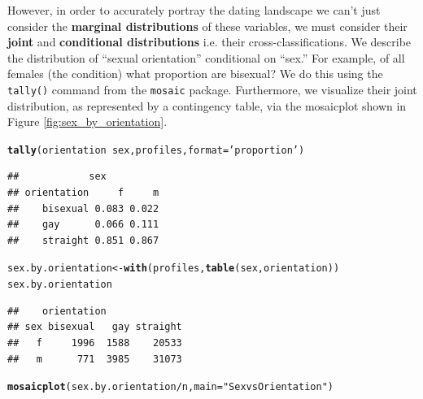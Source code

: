 \documentclass{article}\usepackage[]{graphicx}\usepackage[]{color}
\makeatletter
\newcommand{\hlstr}[1]{\textcolor[rgb]{0.192,0.494,0.8}{#1}}%
\newcommand{\hlopt}[1]{\textcolor[rgb]{0,0,0}{#1}}%
\newcommand{\hlstd}[1]{\textcolor[rgb]{0.345,0.345,0.345}{#1}}%
\newcommand{\hlkwb}[1]{\textcolor[rgb]{0.69,0.353,0.396}{#1}}%
\newcommand{\hlkwc}[1]{\textcolor[rgb]{0.333,0.667,0.333}{#1}}%
\newcommand{\hlkwd}[1]{\textcolor[rgb]{0.737,0.353,0.396}{\textbf{#1}}}%
\newenvironment{kframe}{%
 \def\at@end@of@kframe{}%
 \ifinner\ifhmode%
  \def\at@end@of@kframe{\end{minipage}}%
  \begin{minipage}{\columnwidth}%
 \fi\fi%
 \def\FrameCommand##1{\hskip\@totalleftmargin \hskip-\fboxsep
 \colorbox{shadecolor}{##1}\hskip-\fboxsep
     \hskip-\linewidth \hskip-\@totalleftmargin \hskip\columnwidth}%
 \MakeFramed {\advance\hsize-\width
   \@totalleftmargin\z@ \linewidth\hsize
   \@setminipage}}%
 {\par\unskip\endMakeFramed%
 \at@end@of@kframe}
\newenvironment{knitrout}{}{} %
\makeatother
\begin{document}
However, in order to accurately portray the dating landscape we can't just consider the \textbf{marginal distributions} of these variables, we must consider their \textbf{joint} and \textbf{conditional distributions} i.e. their cross-classifications.  We describe the distribution of ``sexual orientation'' conditional on ``sex.''  For example, of all females (the condition) what proportion are bisexual?  We do this using the \verb#tally()# command from the \verb#mosaic# package.  Furthermore, we visualize their joint distribution, as represented by a contingency table, via the mosaicplot shown in Figure \ref{fig:sex_by_orientation}.

\begin{knitrout}
\color{fgcolor}\begin{kframe}
\begin{alltt}
\hlkwd{tally}\hlstd{(orientation} \hlopt{~} \hlstd{sex, profiles,} \hlkwc{format}\hlstd{=}\hlstr{'proportion'}\hlstd{)}
\end{alltt}
\begin{verbatim}
##            sex
## orientation     f     m
##    bisexual 0.083 0.022
##    gay      0.066 0.111
##    straight 0.851 0.867
\end{verbatim}
\begin{alltt}
\hlstd{sex.by.orientation} \hlkwb{<-} \hlkwd{with}\hlstd{(profiles,} \hlkwd{table}\hlstd{(sex, orientation))}
\hlstd{sex.by.orientation}
\end{alltt}
\begin{verbatim}
##    orientation
## sex bisexual   gay straight
##   f     1996  1588    20533
##   m      771  3985    31073
\end{verbatim}
\begin{alltt}
\hlkwd{mosaicplot}\hlstd{(sex.by.orientation}\hlopt{/}\hlstd{n,} \hlkwc{main}\hlstd{=}\hlstr{"Sex vs Orientation"}\hlstd{)}
\end{alltt}
\end{kframe}\begin{figure}


\end{figure}
\end{knitrout}
\end{document}

